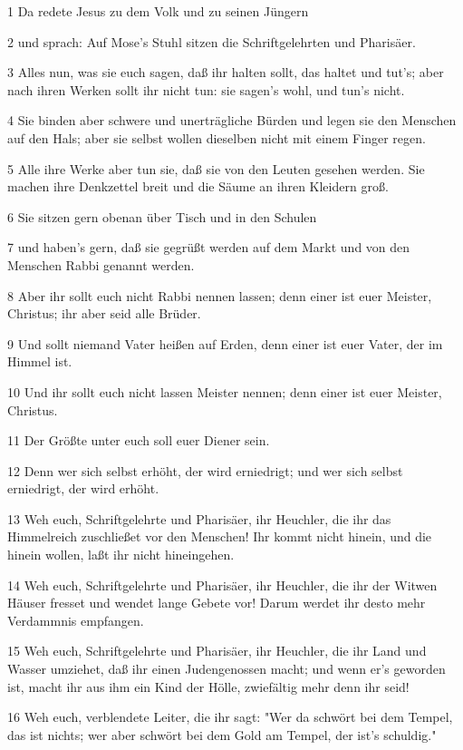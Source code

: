 \par 1 Da redete Jesus zu dem Volk und zu seinen Jüngern
\par 2 und sprach: Auf Mose's Stuhl sitzen die Schriftgelehrten und Pharisäer.
\par 3 Alles nun, was sie euch sagen, daß ihr halten sollt, das haltet und tut's; aber nach ihren Werken sollt ihr nicht tun: sie sagen's wohl, und tun's nicht.
\par 4 Sie binden aber schwere und unerträgliche Bürden und legen sie den Menschen auf den Hals; aber sie selbst wollen dieselben nicht mit einem Finger regen.
\par 5 Alle ihre Werke aber tun sie, daß sie von den Leuten gesehen werden. Sie machen ihre Denkzettel breit und die Säume an ihren Kleidern groß.
\par 6 Sie sitzen gern obenan über Tisch und in den Schulen
\par 7 und haben's gern, daß sie gegrüßt werden auf dem Markt und von den Menschen Rabbi genannt werden.
\par 8 Aber ihr sollt euch nicht Rabbi nennen lassen; denn einer ist euer Meister, Christus; ihr aber seid alle Brüder.
\par 9 Und sollt niemand Vater heißen auf Erden, denn einer ist euer Vater, der im Himmel ist.
\par 10 Und ihr sollt euch nicht lassen Meister nennen; denn einer ist euer Meister, Christus.
\par 11 Der Größte unter euch soll euer Diener sein.
\par 12 Denn wer sich selbst erhöht, der wird erniedrigt; und wer sich selbst erniedrigt, der wird erhöht.
\par 13 Weh euch, Schriftgelehrte und Pharisäer, ihr Heuchler, die ihr das Himmelreich zuschließet vor den Menschen! Ihr kommt nicht hinein, und die hinein wollen, laßt ihr nicht hineingehen.
\par 14 Weh euch, Schriftgelehrte und Pharisäer, ihr Heuchler, die ihr der Witwen Häuser fresset und wendet lange Gebete vor! Darum werdet ihr desto mehr Verdammnis empfangen.
\par 15 Weh euch, Schriftgelehrte und Pharisäer, ihr Heuchler, die ihr Land und Wasser umziehet, daß ihr einen Judengenossen macht; und wenn er's geworden ist, macht ihr aus ihm ein Kind der Hölle, zwiefältig mehr denn ihr seid!
\par 16 Weh euch, verblendete Leiter, die ihr sagt: "Wer da schwört bei dem Tempel, das ist nichts; wer aber schwört bei dem Gold am Tempel, der ist's schuldig."
